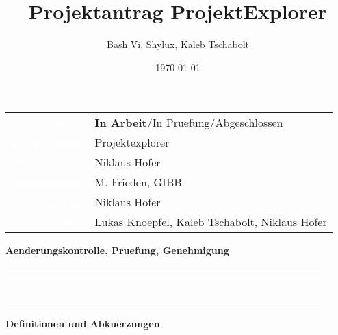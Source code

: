 \documentclass[10pt,paper=a4,final]{scrartcl}
\title{Projektantrag ProjektExplorer}
\author{Bash Vi, Shylux, Kaleb Tschabolt}
\date{\today}
\begin{document}
\maketitle
\newpage
\begin{tabularx}{\textwidth}{ r X }	%
\textcolor{white}{{\bf Status}}\cellcolor{blue!80!} & {\bf In Arbeit}/In Pruefung/Abgeschlossen\cellcolor{blue!20!} \\
\textcolor{white}{{\bf Projektname}}\cellcolor{blue!80!} & Projektexplorer\cellcolor{blue!20!} \\
\textcolor{white}{{\bf Projektleiter}}\cellcolor{blue!80!} & Niklaus Hofer\cellcolor{blue!20!} \\
\textcolor{white}{{\bf Auftraggeber}}\cellcolor{blue!80!} & M. Frieden, GIBB\cellcolor{blue!20!} \\
\textcolor{white}{{\bf Autoren}}\cellcolor{blue!80!} & Niklaus Hofer\cellcolor{blue!20!} \\
\textcolor{white}{{\bf Verteiler}}\cellcolor{blue!80!} & Lukas Knoepfel, Kaleb Tschabolt, Niklaus Hofer\cellcolor{blue!20!}
\end{tabularx}
\newline
\newline
\newline
{\bf Aenderungskontrolle, Pruefung, Genehmigung}
\newline

\begin{tabularx}{\textwidth}{l l X X}
\textcolor{white}{Version}\cellcolor{blue!80!} & \textcolor{white}{Datum}\cellcolor{blue!80!} & \textcolor{white}{Beschreibung, Bemerkung}\cellcolor{blue!80!} & \textcolor{white}{Name oder Rolle}\cellcolor{blue!80!} \\
\cellcolor{blue!20!} & \cellcolor{blue!20!} & \cellcolor{blue!20!} & \cellcolor{blue!20!} \\
\cellcolor{blue!20!} & \cellcolor{blue!20!} & \cellcolor{blue!20!} & \cellcolor{blue!20!} \\
\cellcolor{blue!20!} & \cellcolor{blue!20!} & \cellcolor{blue!20!} & \cellcolor{blue!20!} \\
\cellcolor{blue!20!} & \cellcolor{blue!20!} & \cellcolor{blue!20!} & \cellcolor{blue!20!} \\
\end{tabularx}
\newline
\newline
\newline
{\bf Definitionen und Abkuerzungen}
\newline
\end{document}
